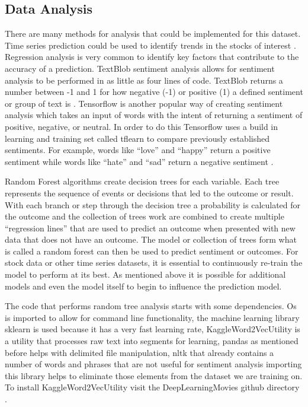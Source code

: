 \documentclass[sigconf]{acmart}
\begin{document}
\subsection{Data Analysis}
There are many methods for analysis that could be implemented for this dataset. Time series prediction could be used to identify trends in the stocks of interest \cite{ARMANO}. Regression analysis is very common to identify key factors that contribute to the accuracy of a  prediction. TextBlob sentiment analysis allows for sentiment analysis to be performed in as little as four lines of code. TextBlob returns a number between -1 and 1 for how negative (-1) or positive (1) a defined sentiment or group of text is \cite{www-textblob}. Tensorflow is another popular way of creating sentiment analysis which takes an input of words with the intent of returning a sentiment of positive, negative, or neutral. In order to do this Tensorflow uses a build in learning and training set called tflearn to compare previously established sentiments. For example, words like ``love'' and ``happy'' return a positive sentiment while words like ``hate'' and ``sad'' return a negative sentiment \cite{www-oreilyTensor}.

Random Forest algorithms create decision trees for each variable. Each tree represents the sequence of events or decisions that led to the outcome or result. With each branch or step through the decision tree a probability is calculated for the outcome and the collection of trees work are combined to create multiple ``regression lines'' that are used to predict an outcome when presented with new data that does not have an outcome. The model or collection of trees form what is called a random forest can then be used to predict sentiment or outcomes. For stock data or other time series datasets, it is essential to continuously re-train the model to perform at its best. As mentioned above it is possible for additional models and even the model itself to begin to influence the prediction model.

The code that performs random tree analysis starts with some dependencies. Os is imported to allow for command line functionality, the machine learning library sklearn is used because it has a very fast learning rate, KaggleWord2VecUtility is a utility that processes raw text into segments for learning, pandas as mentioned before helps with delimited file manipulation, nltk that already contains a number of words and phrases that are not useful for sentiment analysis importing this library helps to eliminate those elements from the dataset we are training on. To install KaggleWord2VecUtility visit the DeepLearningMovies github directory \cite{kaggle}. 
\end{document}
